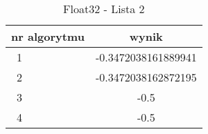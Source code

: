 \begin{table}[t]
    \caption{Float32 - Lista 2}
    \label{vectors2}
    \centering
    \begin{tabular}{|l|c|}
        \hline 
        \textbf{nr algorytmu} & \textbf{wynik} \\
        \hline
        \ 1 & -0.3472038161889941\\
        \hline
        \ 2 & -0.3472038162872195\\
        \hline
        \ 3 & -0.5\\
        \hline
        \ 4 & -0.5\\
        \hline
    \end{tabular} 
\end{table}